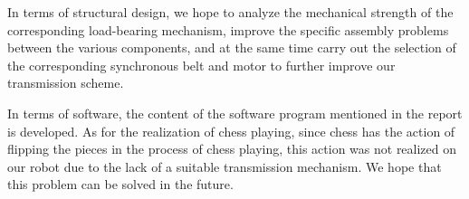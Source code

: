 \documentclass[10pt, a4paper, twocolumn]{article}
\begin{document}
In terms of structural design, we hope to analyze the mechanical strength of the corresponding load-bearing mechanism, improve the specific assembly problems between the various components, and at the same time carry out the selection of the corresponding synchronous belt and motor to further improve our transmission scheme.

In terms of software, the content of the software program mentioned in the report is developed. As for the realization of chess playing, since chess has the action of flipping the pieces in the process of chess playing, this action was not realized on our robot due to the lack of a suitable transmission mechanism. We hope that this problem can be solved in the future.




\end{document}
